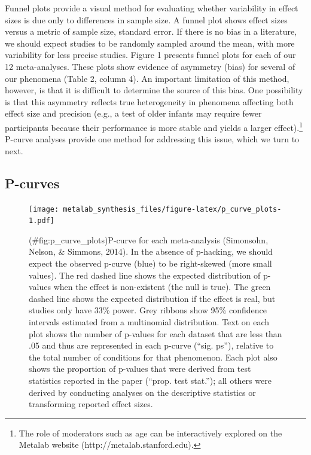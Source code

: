 \documentclass[english,floatsintext,man]{apa6}
\theoremstyle{definition}
\theoremstyle{definition}
\theoremstyle{remark}
\begin{document}
Funnel plots provide a visual method for evaluating whether variability
in effect sizes is due only to differences in sample size. A funnel plot
shows effect sizes versus a metric of sample size, standard error. If
there is no bias in a literature, we should expect studies to be
randomly sampled around the mean, with more variability for less precise
studies. Figure 1 presents funnel plots for each of our 12
meta-analyses. These plots show evidence of asymmetry (bias) for several
of our phenomena (Table 2, column 4). An important limitation of this
method, however, is that it is difficult to determine the source of this
bias. One possibility is that this asymmetry reflects true heterogeneity
in phenomena affecting both effect size and precision (e.g., a test of
older infants may require fewer participants because their performance
is more stable and yields a larger
effect).\footnote{The role of moderators such as age can be interactively explored on the Metalab website (http://metalab.stanford.edu).}
P-curve analyses provide one method for addressing this issue, which we
turn to next.

\subsection{P-curves}\label{p-curves}

\begin{figure}
\centering
\texttt{[image: metalab\_synthesis\_files/figure-latex/p\_curve\_plots-1.pdf]}
\caption{(\#fig:p\_curve\_plots)P-curve for each meta-analysis
(Simonsohn, Nelson, \& Simmons, 2014). In the absence of p-hacking, we
should expect the observed p-curve (blue) to be right-skewed (more small
values). The red dashed line shows the expected distribution of p-values
when the effect is non-existent (the null is true). The green dashed
line shows the expected distribution if the effect is real, but studies
only have 33\% power. Grey ribbons show 95\% confidence intervals
estimated from a multinomial distribution. Text on each plot shows the
number of p-values for each dataset that are less than .05 and thus are
represented in each p-curve (\enquote{sig. ps}), relative to the total
number of conditions for that phenomenon. Each plot also shows the
proportion of p-values that were derived from test statistics reported
in the paper (\enquote{prop. test stat.}); all others were derived by
conducting analyses on the descriptive statistics or transforming
reported effect sizes.}
\end{figure}
\end{document}

